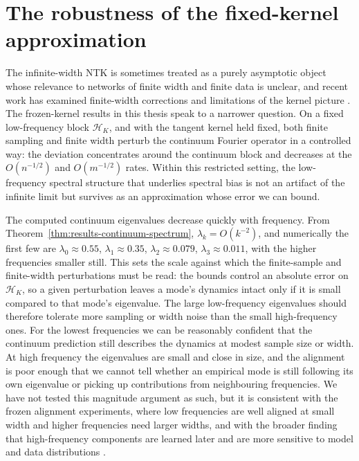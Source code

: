 \section{The robustness of the fixed-kernel approximation}
\label{sec:discussion-robustness}

The infinite-width NTK is sometimes treated as a purely asymptotic object whose
relevance to networks of finite width and finite data is unclear, and recent
work has examined finite-width corrections and limitations of the kernel
picture \citep{haninNica2019finite,bordelon2023dynamicsfinitewidthkernel,
	vyas2022limitationsntkunderstandinggeneralization}. The frozen-kernel results
in this thesis speak to a narrower question. On a fixed low-frequency block
\(\mathcal{H}_K\), and with the tangent kernel held fixed, both finite sampling
and finite width perturb the continuum Fourier operator in a controlled way:
the deviation concentrates around the continuum block and decreases at the
\(O(n^{-1/2})\) and \(O(m^{-1/2})\) rates. Within this restricted setting, the
low-frequency spectral structure that underlies spectral bias is not an artifact
of the infinite limit but survives as an approximation whose error we can bound.

The computed continuum eigenvalues decrease quickly with frequency. From
Theorem~\ref{thm:results-continuum-spectrum}, \(\lambda_k = O(k^{-2})\), and
numerically the first few are \(\lambda_0 \approx 0.55\), \(\lambda_1 \approx
0.35\), \(\lambda_2 \approx 0.079\), \(\lambda_3 \approx 0.011\), with the
higher frequencies smaller still. This sets the scale against which the
finite-sample and finite-width perturbations must be read: the bounds control an
absolute error on \(\mathcal H_K\), so a given perturbation leaves a mode's
dynamics intact only if it is small compared to that mode's eigenvalue. The large
low-frequency eigenvalues should therefore tolerate more sampling or width noise
than the small high-frequency ones. For the lowest frequencies we can be
reasonably confident that the continuum prediction still describes the dynamics
at modest sample size or width. At high frequency the eigenvalues are small and
close in size, and the alignment is poor enough that we cannot tell whether an
empirical mode is still following its own eigenvalue or picking up contributions
from neighbouring frequencies. We have not tested this magnitude argument as such,
but it is consistent with the frozen alignment experiments, where low frequencies
are well aligned at small width and higher frequencies need larger widths, and
with the broader finding that high-frequency components are learned later and are
more sensitive to model and data distributions
\citep{rahaman2019spectralbiasneuralnetworks,basri2019convergence,
	basri2020frequencybiasneuralnetworks}.

